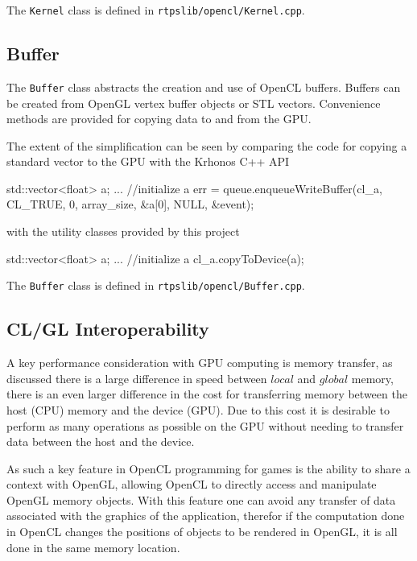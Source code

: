The \verb|Kernel| class is defined in \verb|rtpslib/opencl/Kernel.cpp|.


\subsection{Buffer}

The \verb|Buffer| class abstracts the creation and use of OpenCL buffers.
Buffers can be created from OpenGL vertex buffer objects or STL vectors.
Convenience methods are provided for copying data to and from the GPU.

The extent of the simplification can be seen by comparing the code for copying a
standard vector to the GPU with the Krhonos C++ API
\begin{cppcode}{0}
     std::vector<float> a; 
     ... //initialize a 
     err = queue.enqueueWriteBuffer(cl_a, CL_TRUE, 0, array_size, &a[0], NULL, 
         &event);
\end{cppcode}

with the utility classes provided by this project
\begin{cppcode}{0}
    std::vector<float> a; 
     ... //initialize a 
    cl_a.copyToDevice(a);
\end{cppcode}


The \verb|Buffer| class is defined in \verb|rtpslib/opencl/Buffer.cpp|.


\subsection{CL/GL Interoperability}
A key performance consideration with GPU computing is memory transfer, as
discussed there is a large difference in speed between $local$ and $global$
memory, there is an even larger difference in the cost for transferring memory
between the host (CPU) memory and the device (GPU). Due to this cost it is
desirable to perform as many operations as possible on the GPU without needing
to transfer data between the host and the device.


As such a key feature in OpenCL programming for games is the ability to share a
context with OpenGL, allowing OpenCL to directly access and manipulate OpenGL
memory objects. With this feature one can avoid any transfer of data associated
with the graphics of the application, therefor if the computation done in
OpenCL changes the positions of objects to be rendered in OpenGL, it is all
done in the same memory location.



